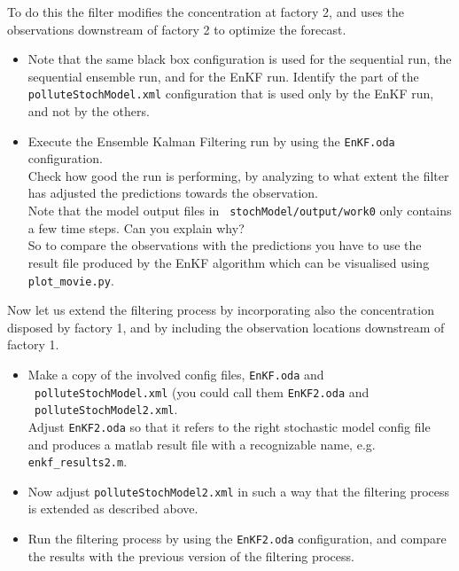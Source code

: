 To do this the filter modifies the concentration at factory 2, and uses the
observations downstream of factory 2 to optimize the forecast.

\begin{itemize}
 \item Note that the same black box configuration is used for the sequential
   run, the sequential ensemble run, and for the EnKF run. Identify the part of
   the {\tt polluteStochModel.xml} configuration that is used only by the EnKF
   run, and not by the others.
 \item Execute the Ensemble Kalman Filtering run by using the {\tt EnKF.oda}
   configuration.\\ Check how good the run is performing, by analyzing to what
   extent the filter has adjusted the predictions towards the
   observation.\\ Note that the model output files in {\tt
     stochModel/output/work0} only contains a few time steps. Can you explain
   why?\\ So to compare the observations with the predictions you have to use
   the result file produced by the EnKF algorithm which can be visualised using
   {\tt plot\_movie.py}.
\end{itemize}

Now let us extend the filtering process by incorporating also the concentration
disposed by factory 1, and by including the observation locations downstream of
factory 1.

\begin{itemize}
 \item Make a copy of the involved config files, {\tt EnKF.oda} and \\{\tt
   polluteStochModel.xml} (you could call them {\tt EnKF2.oda} and\\ {\tt
   polluteStochModel2.xml}.\\ Adjust {\tt EnKF2.oda} so that it refers to the
   right stochastic model config file and produces a matlab result file with a
   recognizable name, e.g. {\tt enkf\_results2.m}.
 \item Now adjust {\tt polluteStochModel2.xml} in such a way that the filtering
   process is extended as described above.
 \item Run the filtering process by using the {\tt EnKF2.oda} configuration,
   and compare the results with the previous version of the filtering process.
\end{itemize}

